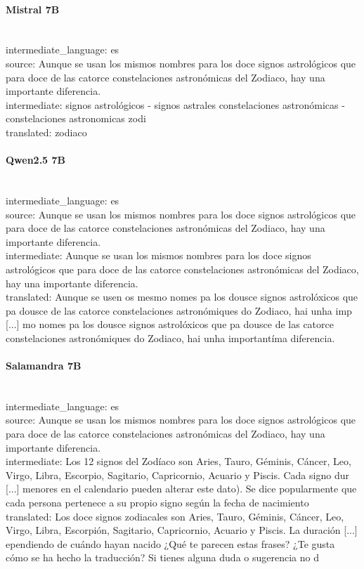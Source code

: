 \paragraph{Mistral 7B}~\\
{intermediate\_language:} es\\
{source:} Aunque se usan los mismos nombres para los doce signos astrológicos que para doce de las catorce constelaciones astronómicas del Zodiaco, hay una importante diferencia.\\
{intermediate:} signos astrológicos - signos astrales constelaciones astronómicas - constelaciones astronomicas zodi\\
{translated:} zodiaco\\

\paragraph{Qwen2.5 7B}~\\
{intermediate\_language:} es\\
{source:} Aunque se usan los mismos nombres para los doce signos astrológicos que para doce de las catorce constelaciones astronómicas del Zodiaco, hay una importante diferencia.\\
{intermediate:} Aunque se usan los mismos nombres para los doce signos astrológicos que para doce de las catorce constelaciones astronómicas del Zodiaco, hay una importante diferencia.\\
{translated:} Aunque se usen os mesmo nomes pa los dousce signos astrolóxicos que pa dousce de las catorce constelaciones astronómiques do Zodiaco, hai unha imp [...] mo nomes pa los dousce signos astrolóxicos que pa dousce de las catorce constelaciones astronómiques do Zodiaco, hai unha importantíma diferencia.\\

\paragraph{Salamandra 7B}~\\
{intermediate\_language:} es\\
{source:} Aunque se usan los mismos nombres para los doce signos astrológicos que para doce de las catorce constelaciones astronómicas del Zodiaco, hay una importante diferencia.\\
{intermediate:} Los 12 signos del Zodíaco son Aries, Tauro, Géminis, Cáncer, Leo, Virgo, Libra, Escorpio, Sagitario, Capricornio, Acuario y Piscis. Cada signo dur [...] menores en el calendario pueden alterar este dato). Se dice popularmente que cada persona pertenece a su propio signo según la fecha de nacimiento\\
{translated:} Los doce signos zodiacales son Aries, Tauro, Géminis, Cáncer, Leo, Virgo, Libra, Escorpión, Sagitario, Capricornio, Acuario y Piscis. La duración  [...] ependiendo de cuándo hayan nacido  ¿Qué te parecen estas frases? ¿Te gusta cómo se ha hecho la traducción? Si tienes alguna duda o sugerencia no d\\

